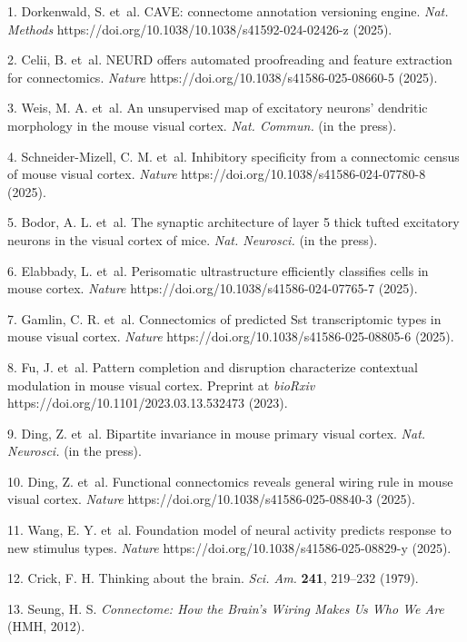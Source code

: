 \documentclass{article}
\begin{document}
\begin{hangpars}\small

1. Dorkenwald, S. et~al. CAVE: connectome annotation versioning engine. \emph{Nat. Methods} https://doi.org/10.1038/10.1038/s41592-024-02426-z (2025). 

2. Celii, B. et~al. NEURD offers automated proofreading and feature extraction for connectomics. \emph{Nature} https://doi.org/10.1038/s41586-025-08660-5 (2025). 

3. Weis, M. A. et~al. An unsupervised map of excitatory neurons’ dendritic morphology in the mouse visual cortex. \emph{Nat. Commun.} (in the press). 

4. Schneider-Mizell, C. M. et~al. Inhibitory specificity from a connectomic census of mouse visual cortex. \emph{Nature} https://doi.org/10.1038/s41586-024-07780-8 (2025). 

5. Bodor, A. L. et~al. The synaptic architecture of layer 5 thick tufted excitatory neurons in the visual cortex of mice. \emph{Nat. Neurosci.} (in the press). 

6. Elabbady, L. et~al. Perisomatic ultrastructure efficiently classifies cells in mouse cortex. \emph{Nature} https://doi.org/10.1038/s41586-024-07765-7 (2025). 

7. Gamlin, C. R. et~al. Connectomics of predicted Sst transcriptomic types in mouse visual cortex. \emph{Nature} https://doi.org/10.1038/s41586-025-08805-6 (2025). 

8. Fu, J. et~al. Pattern completion and disruption characterize contextual modulation in mouse visual cortex. Preprint at \emph{bioRxiv} https://doi.org/10.1101/2023.03.13.532473 (2023). 

9. Ding, Z. et~al. Bipartite invariance in mouse primary visual cortex. \emph{Nat. Neurosci.} (in the press). 

10. Ding, Z. et~al. Functional connectomics reveals general wiring rule in mouse visual cortex. \emph{Nature} https://doi.org/10.1038/s41586-025-08840-3 (2025). 

11. Wang, E. Y. et~al. Foundation model of neural activity predicts response to new stimulus types. \emph{Nature} https://doi.org/10.1038/s41586-025-08829-y (2025). 

12. Crick, F. H. Thinking about the brain. \emph{Sci. Am.} \textbf{241}, 219–232 (1979). 

13. Seung, H. S. \emph{Connectome: How the Brain’s Wiring Makes Us Who We Are} (HMH, 2012). 


\end{hangpars}
\end{document}
